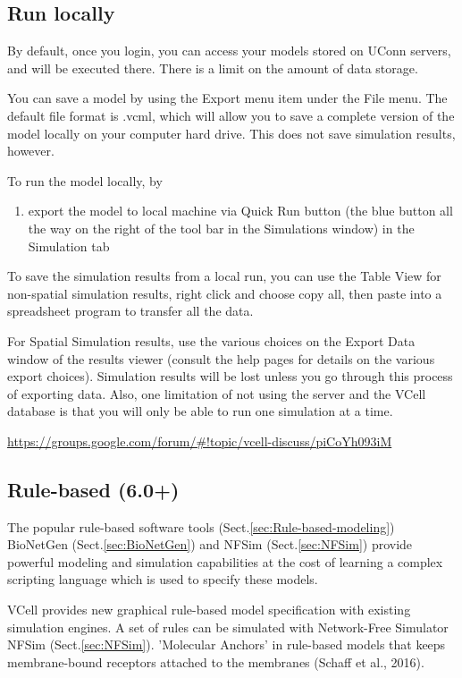 \subsection{Run locally}

By default, once you login, you can access your models stored on UConn servers,
and will be executed there. There is a limit on the amount of data storage.

You can save a model by using the Export menu item under the File menu. The
default file format is .vcml, which will allow you to save a complete version of
the model locally on your computer hard drive. This does not save simulation
results, however.

To run the model locally, by
\begin{enumerate}
  \item export the model to local machine via Quick Run button
  (the blue button all the way on the right of the tool bar in the Simulations
  window) in the Simulation tab
 
\end{enumerate}

To save the simulation results from a local run, you can use the Table View for
non-spatial simulation results, right click and choose copy all, then paste into
a spreadsheet program to transfer all the data. 

For Spatial Simulation results, use the various choices on the Export Data
window of the results viewer (consult the help pages for details on the various
export choices). Simulation results will be lost unless you go through this
process of exporting data. Also, one limitation of not using the server and the
VCell database is that you will only be able to run one simulation at a time.

\url{https://groups.google.com/forum/#!topic/vcell-discuss/piCoYh093iM}

\subsection{Rule-based (6.0+)}
\label{sec:VirtualCell-Rule-based}

The popular rule-based software tools (Sect.\ref{sec:Rule-based-modeling})
BioNetGen (Sect.\ref{sec:BioNetGen}) and NFSim (Sect.\ref{sec:NFSim}) provide
powerful modeling and simulation capabilities at the cost of learning a complex
scripting language which is used to specify these models.

VCell provides new graphical rule-based model specification with existing
simulation engines. A set of rules can be simulated with Network-Free Simulator NFSim
(Sect.\ref{sec:NFSim}). 'Molecular Anchors' in rule-based models that keeps
membrane-bound receptors attached to the membranes (Schaff et al., 2016).

